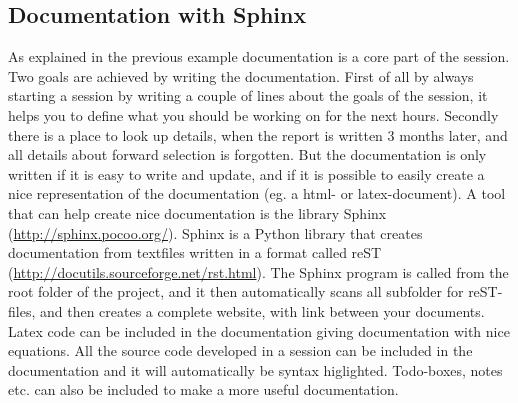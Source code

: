 \subsection{Documentation with Sphinx}
As explained in the previous example documentation is a core part of the session. Two goals are achieved by writing the documentation. First of all by always starting a session by writing a couple of lines about the goals of the session, it helps you to define what you should be working on for the next hours. Secondly there is a place to look up details, when the report is written 3 months later, and all details about forward selection is forgotten. But the documentation is only written if it is easy to write and update, and if it is possible to easily create a nice representation of the documentation (eg. a html- or latex-document). A tool that can help create nice documentation is the library Sphinx (\url{http://sphinx.pocoo.org/}). Sphinx is a Python library that creates documentation from textfiles written in a format called reST (\url{http://docutils.sourceforge.net/rst.html}). The Sphinx program is called from the root folder of the project, and it then automatically scans all subfolder for reST-files, and then creates a complete website, with link between your documents. Latex code can be included in the documentation giving documentation with nice equations. All the source code developed in a session can be included in the documentation and it will automatically be syntax higlighted. Todo-boxes, notes etc. can also be included to make a more useful documentation.

